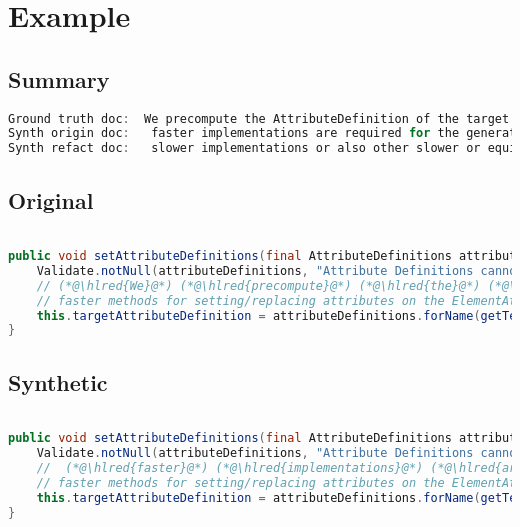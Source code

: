 \documentclass[11pt]{article}
\DeclareRobustCommand{\hlred}[1]{{\sethlcolor{YellowOrange}\hl{#1}}}
\begin{document}
  \pagebreak
  \section{Example}
  \subsection{Summary}

  \begin{lstlisting}[language=java]
Ground truth doc:  We precompute the AttributeDefinition of the target attribute in order to being able to use much
Synth origin doc:   faster implementations are required for the generation but cannot override or replace attributes instead of just
Synth refact doc:   slower implementations or also other slower or equivalent methods are encouraged and can instead invoke only
  \end{lstlisting}

  \subsection{Original}
  \begin{lstlisting}[language=java]

public void setAttributeDefinitions(final AttributeDefinitions attributeDefinitions) {
    Validate.notNull(attributeDefinitions, "Attribute Definitions cannot be null");
    // (*@\hlred{We}@*) (*@\hlred{precompute}@*) (*@\hlred{the}@*) (*@\hlred{AttributeDefinition}@*) (*@\hlred{of}@*) the (*@\hlred{target}@*) (*@\hlred{attribute}@*) (*@\hlred{in}@*) (*@\hlred{order}@*) (*@\hlred{to}@*) (*@\hlred{being}@*) (*@\hlred{able}@*) (*@\hlred{to}@*) (*@\hlred{use}@*) (*@\hlred{much}@*)
    // faster methods for setting/replacing attributes on the ElementAttributes implementation
    this.targetAttributeDefinition = attributeDefinitions.forName(getTemplateMode(), this.targetAttrCompleteName);
}
  \end{lstlisting}
  \subsection{Synthetic}

  \begin{lstlisting}[language=java]

public void setAttributeDefinitions(final AttributeDefinitions attributeDefinitions) {
    Validate.notNull(attributeDefinitions, "Attribute Definitions cannot be null");
    //  (*@\hlred{faster}@*) (*@\hlred{implementations}@*) (*@\hlred{are}@*) (*@\hlred{required}@*) (*@\hlred{for}@*) the (*@\hlred{generation}@*) (*@\hlred{but}@*) (*@\hlred{cannot}@*) (*@\hlred{override}@*) (*@\hlred{or}@*) (*@\hlred{replace}@*) (*@\hlred{attributes}@*) (*@\hlred{instead}@*) (*@\hlred{of}@*) (*@\hlred{just}@*)
    // faster methods for setting/replacing attributes on the ElementAttributes implementation
    this.targetAttributeDefinition = attributeDefinitions.forName(getTemplateMode(), this.targetAttrCompleteName);
}
  \end{lstlisting}
\end{document}
